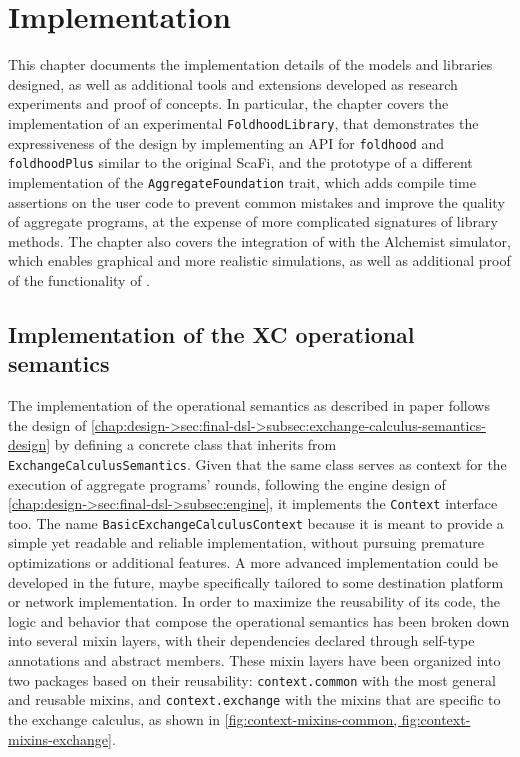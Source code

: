 \chapter{Implementation}
\label{chap:implementation}

This chapter documents the implementation details of the models and libraries designed, as well as additional tools and extensions developed as research experiments and proof of concepts.
%
In particular, the chapter covers the implementation of an experimental \texttt{FoldhoodLibrary}, that demonstrates the expressiveness of the \this design by implementing an \ac{API} for \texttt{foldhood} and \texttt{foldhoodPlus} similar to the original ScaFi, and the prototype of a different implementation of the \texttt{AggregateFoundation} trait, which adds compile time assertions on the user code to prevent common mistakes and improve the quality of aggregate programs, at the expense of more complicated signatures of library methods.
%
The chapter also covers the integration of \this with the Alchemist simulator, which enables graphical and more realistic simulations, as well as additional proof of the functionality of \this.

\section{Implementation of the XC operational semantics} \label{chap:implementation->sec:xc-ops}

The implementation of the operational semantics as described in paper\cite{xc} follows the design of \cref{chap:design->sec:final-dsl->subsec:exchange-calculus-semantics-design} by defining a concrete class that inherits from \texttt{ExchangeCalculusSemantics}.
%
Given that the same class serves as context for the execution of aggregate programs' rounds, following the engine design of \cref{chap:design->sec:final-dsl->subsec:engine}, it implements the \texttt{Context} interface too.
%
The name \texttt{BasicExchangeCalculusContext} because it is meant to provide a simple yet readable and reliable implementation, without pursuing premature optimizations or additional features.
%
A more advanced implementation could be developed in the future, maybe specifically tailored to some destination platform or network implementation.
%
In order to maximize the reusability of its code, the logic and behavior that compose the operational semantics has been broken down into several mixin layers, with their dependencies declared through self-type annotations and abstract members.
%
These mixin layers have been organized into two packages based on their reusability: \texttt{context.common} with the most general and reusable mixins, and \texttt{context.exchange} with the mixins that are specific to the exchange calculus, as shown in \cref{fig:context-mixins-common, fig:context-mixins-exchange}.


